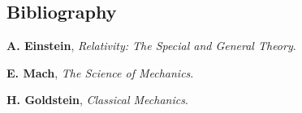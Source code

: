 \documentclass[11pt]{article}
\begin{document}
\medskip

\vspace{-0.6mm}

{\centering\subsection*{Bibliography}}

\vspace{-1.2mm}

\par \textbf{A. Einstein}, \textit{Relativity: The Special and General Theory}.
\medskip
\par \textbf{E. Mach}, \textit{The Science of Mechanics}.
\medskip
\par \textbf{H. Goldstein}, \textit{Classical Mechanics}.

\vspace{-0.9mm}
\end{document}
